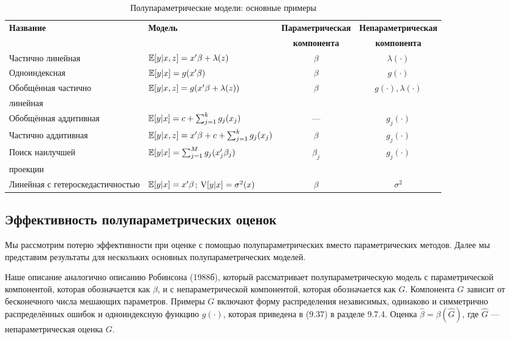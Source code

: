 \begin{table}[h]
\begin{center}
\begin{small}
\caption{\label{tab:semipar} Полупараметрические модели: основные примеры}
\begin{tabular}[t]{llcc}
\hline
\hline
\bf{Название} & \bf{Модель} & \bf{Параметрическая} & \bf{Непараметрическая} \\
 & & \bf{компонента} & \bf{компонента} \\
\hline
Частично линейная & $\mathbb{E}[y|x,z] = x'\beta + \lambda(z)$ & $\beta$ & $\lambda(\cdot)$ \\
Одноиндексная & $\mathbb{E}[y|x] = g(x'\beta)$ & $\beta$ & $g(\cdot)$ \\
Обобщённая частично & $\mathbb{E}[y|x,z] = g(x'\beta + \lambda(z))$ & $\beta$ & $g(\cdot),\lambda(\cdot)$ \\
линейная & & & \\
Обобщённая аддитивная & $\mathbb{E}[y|x] = c + \sum_{j=1}^k g_j(x_j)$ & --- & $g_j(\cdot)$ \\
Частично аддитивная & $\mathbb{E}[y|x,z] = x'\beta + c + \sum_{j=1}^k g_j(x_j)$ & $\beta$ & $g_j(\cdot)$ \\
Поиск наилучшей & $\mathbb{E}[y|x] = \sum_{j=1}^M g_j(x_j'\beta_j)$ & $\beta_j$ & $g_j(\cdot)$ \\
проекции & & & \\
Линейная с гетероскедастичностью & $\mathbb{E}[y|x] = x'\beta$; $\mathrm{V}[y|x] = \sigma^2(x)$ & $\beta$ & $\sigma^2$ \\
\hline
\hline
\end{tabular}
\end{small}
\end{center}
\end{table}

\subsection{Эффективность полупараметрических оценок}

Мы рассмотрим потерю эффективности при оценке с помощью полупараметрических вместо параметрических методов. Далее мы представим результаты для нескольких основных полупараметрических моделей.

Наше описание аналогично описанию Робинсона (1988б), который рассматривает полупараметрическую модель с параметрической компонентой, которая обозначается как $\beta$, и  с непараметрической компонентой, которая обозначается как $G$. Компонента $G$ зависит от бесконечного числа мешающих параметров. Примеры $G$ включают форму распределения независимых, одинаково и симметрично распределённых ошибок и одноиндексную функцию $g(\cdot)$, которая приведена в (9.37) в разделе 9.7.4. Оценка $\hat{\beta} = \beta(\hat{G})$, где $\hat{G}$ --- непараметрическая оценка $G$.

